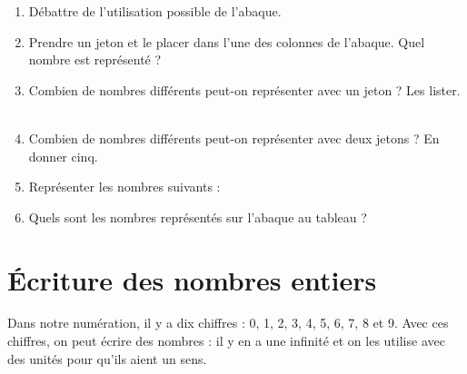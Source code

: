 \begin{activite}
\begin{QCM}
         \begin{enumerate}
            \item Débattre de l'utilisation possible de l'abaque.
            \item Prendre un jeton et le placer dans l'une des colonnes de l'abaque. Quel nombre est représenté ? \\ [1mm]
               \pf \medskip
            \item Combien de nombres différents peut-on représenter avec un jeton ? Les lister. \\ [1mm]
               \pf \\ [3mm]
               \pf \medskip
            \item Combien de nombres différents peut-on représenter avec deux jetons ? En donner cinq. \\ [1mm]
               \pf \medskip
            \item Représenter les nombres suivants :
            \item Quels sont les nombres représentés sur l'abaque au tableau ? \\ [1mm]
               \pf \bigskip
         \end{enumerate}
   \end{QCM}
 \end{activite}


\cours 

\section{Écriture des nombres entiers}

Dans notre numération, il y a dix chiffres : 0, 1, 2, 3, 4, 5, 6, 7, 8 et 9. Avec ces chiffres, on peut écrire des nombres : il y en a une infinité et on les utilise avec des unités pour qu'ils aient un sens.

